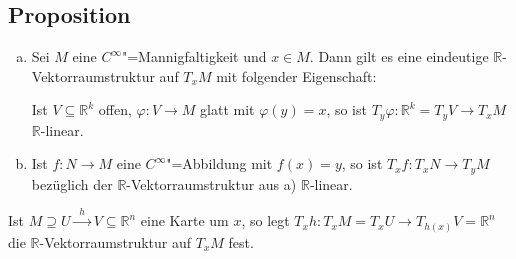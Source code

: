 \subsection[Proposition: Vektorraumstruktur von $T_x M$, Linearität der Tangentialabbildung]{Proposition} %
\label{sub:1813}
\begin{enumerate}[a)]
	\item Sei $M$ eine $C^\infty$"=Mannigfaltigkeit und $x \in M$. Dann gilt es eine eindeutige $\mathds{R}$-Vektorraumstruktur auf $T_x M$ mit folgender
	Eigenschaft:
	
	Ist $V \subseteq \mathds{R}^k$ offen, $\varphi : V \to M$ glatt mit $\varphi(y)=x$, so ist 
	\(
		T_y \varphi : \mathds{R}^k = T_y V \to T_x M
	\)
	$\mathds{R}$-linear.
	\item Ist $f : N \to M$ eine $C^\infty$"=Abbildung mit $f(x)=y$, so ist $T_x f : T_x N \to T_{y} M$ bezüglich der $\mathds{R}$-Vektorraumstruktur aus a) 
	$\mathds{R}$-linear.
\end{enumerate}
Ist $M \supseteq U \xrightarrow{\enspace h \enspace} V \subseteq \mathds{R}^n $ eine Karte um $x$, so  legt $T_x h : T_x M = T_x U \to T_{h(x)}V = \mathds{R}^n$ die
$\mathds{R}$-Vektorraumstruktur auf $T_x M$ fest.
